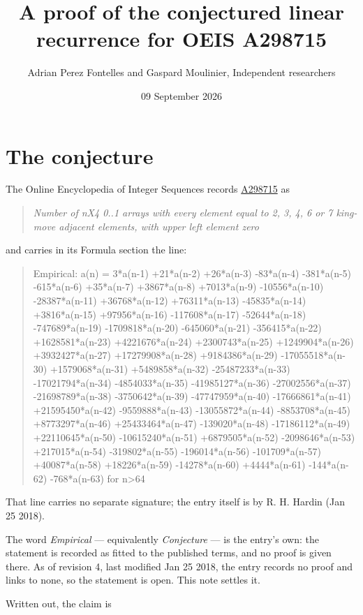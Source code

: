 \documentclass[11pt]{article}
\title{A proof of the conjectured linear recurrence for OEIS A298715}
\author{Adrian Perez Fontelles and Gaspard Moulinier, Independent researchers}
\date{09 September 2026}
\theoremstyle{definition}
\begin{document}
\maketitle
\section{The conjecture}

The Online Encyclopedia of Integer Sequences records \href{https://oeis.org/A298715}{A298715} as

\begin{quote}\itshape Number of nX4 0..1 arrays with every element equal to 2, 3, 4, 6 or 7 king-move adjacent elements, with upper left element zero\end{quote}

and carries in its Formula section the line:

\begin{quote}\ttfamily Empirical: a(n) = 3*a(n-1) +21*a(n-2) +26*a(n-3) -83*a(n-4) -381*a(n-5) -615*a(n-6) +35*a(n-7) +3867*a(n-8) +7013*a(n-9) -10556*a(n-10) -28387*a(n-11) +36768*a(n-12) +76311*a(n-13) -45835*a(n-14) +3816*a(n-15) +97956*a(n-16) -117608*a(n-17) -52644*a(n-18) -747689*a(n-19) -1709818*a(n-20) -645060*a(n-21) -356415*a(n-22) +1628581*a(n-23) +4221676*a(n-24) +2300743*a(n-25) +1249904*a(n-26) +3932427*a(n-27) +17279908*a(n-28) +9184386*a(n-29) -17055518*a(n-30) +1579068*a(n-31) +5489858*a(n-32) -25487233*a(n-33) -17021794*a(n-34) -4854033*a(n-35) -41985127*a(n-36) -27002556*a(n-37) -21698789*a(n-38) -3750642*a(n-39) -47747959*a(n-40) -17666861*a(n-41) +21595450*a(n-42) -9559888*a(n-43) -13055872*a(n-44) -8853708*a(n-45) +8773297*a(n-46) +25433464*a(n-47) -139020*a(n-48) -17186112*a(n-49) +22110645*a(n-50) -10615240*a(n-51) +6879505*a(n-52) -2098646*a(n-53) +217015*a(n-54) -319802*a(n-55) -196014*a(n-56) -101709*a(n-57) +40087*a(n-58) +18226*a(n-59) -14278*a(n-60) +4444*a(n-61) -144*a(n-62) -768*a(n-63) for n>64\end{quote}

That line carries no separate signature; the entry itself is by R. H. Hardin (Jan 25 2018).

The word {\itshape Empirical} --- equivalently {\itshape Conjecture} --- is the entry's own: the statement is recorded as fitted to the published terms, and no proof is given there. As of revision 4, last modified Jan 25 2018, the entry records no proof and links to none, so the statement is open. This note settles it.

Written out, the claim is
\end{document}
